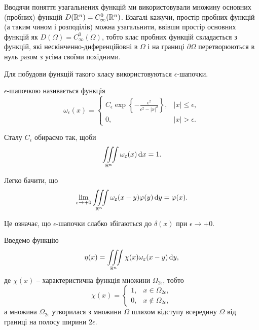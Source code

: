 Вводячи поняття узагальнених функцій ми використовували множину основних (пробних) функцій $D(\mathbb{R}^n) = C_\infty^0(\mathbb{R}^n)$. Взагалі кажучи, простір пробних функцій (а таким чином і розподілів) можна узагальнити, ввівши простір основних функцій як $D(\Omega) = C_\infty^0(\Omega)$, тобто клас пробних функцій складається з функцій, які нескінченно-диференційовні в $\Omega$ і на границі $\partial \Omega$ перетворюються в нуль разом з усіма своїми похідними. \medskip

Для побудови функцій такого класу використовуються $\epsilon$-шапочки.

\begin{definition}
	$\epsilon$-шапочкою називається функція
	\begin{equation}
		\omega_\epsilon(x) = \begin{cases}
			C_\epsilon \exp \left\{ - \frac{\epsilon^2}{\epsilon^2 - |x|^2} \right\}, & |x| \le \epsilon, \\
			0, & |x| > \epsilon.
		\end{cases}
	\end{equation}
\end{definition}

\begin{remark}
	Сталу $C_\epsilon$ обираємо так, щоби 
	\begin{equation}
		\displaystyle\iiint\limits_{\mathbb{R}^n} \omega_\varepsilon (x) \mathop{}\!\mathrm{d} x = 1.
	\end{equation}
\end{remark}

Легко бачити, що 
\begin{equation}
	\displaystyle\lim\limits_{\varepsilon \to +0} \displaystyle\iiint\limits_{\mathbb{R}^n} \omega_\varepsilon(x - y) \varphi(y) \mathop{}\!\mathrm{d} y = \varphi(x).
\end{equation}

Це означає, що $\epsilon$-шапочки слабко збігаються до $\delta(x)$ при $\epsilon \to + 0$. \medskip

Введемо функцію
\begin{equation}
	\eta(x) = \displaystyle\iiint\limits_{\mathbb{R}^n} \chi(x) \omega_\varepsilon(x - y) \mathop{}\!\mathrm{d} y,
\end{equation}
де $\chi(x)$ -- характеристична функція множини $\Omega_{2\epsilon}$, тобто
\begin{equation}
	\chi(x) = \begin{cases}
		1, & x \in \Omega_{2 \epsilon}, \\
		0, & x \notin \Omega_{2 \epsilon}, 
	\end{cases}
\end{equation}
а множина $\Omega_{2 \epsilon}$ утворилася з множини $\Omega$ шляхом відступу всередину $\Omega$ від границі на полосу ширини $2 \epsilon$. \medskip

